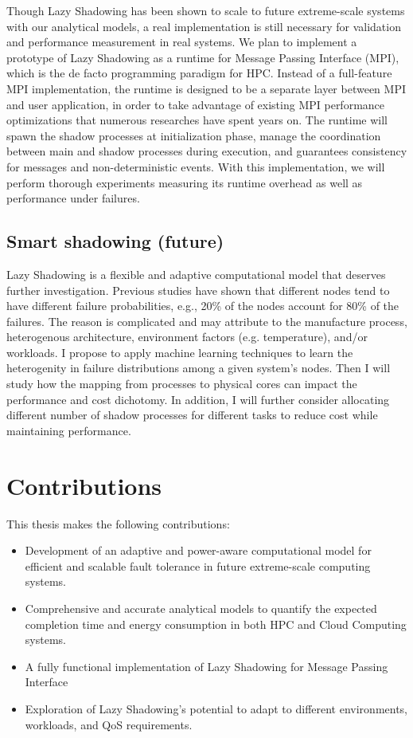 Though Lazy Shadowing has been shown to scale to future extreme-scale systems with our analytical models, a real implementation 
is still necessary for validation and performance measurement in real systems. We plan to implement a prototype of Lazy 
Shadowing as a runtime for Message Passing Interface (MPI), which is the de facto programming paradigm for HPC. Instead of 
a full-feature MPI implementation, the runtime is designed to be a separate layer between MPI and user application, in order 
to take advantage of existing MPI performance optimizations that numerous researches have spent years on. The runtime will spawn 
the shadow processes at initialization phase, manage the coordination between main and shadow processes during execution, 
and guarantees consistency for messages and non-deterministic events. With this implementation, we will perform thorough 
experiments measuring its runtime overhead as well as performance under failures.

\subsection{Smart shadowing (future)}
Lazy Shadowing is a flexible and adaptive computational model that deserves further investigation. Previous studies have shown that 
different nodes tend to have different failure probabilities, e.g., 20\% of the nodes account for 80\% of the failures. The reason 
is complicated and may attribute to the manufacture process, heterogenous architecture, environment factors (e.g. temperature), 
and/or workloads. I propose to apply machine learning techniques to learn the heterogenity in failure distributions among a given 
system's nodes. Then I will study how the mapping from processes to physical cores can impact the performance and cost dichotomy. 
In addition, I will further consider allocating different number of shadow processes for different tasks to reduce cost while 
maintaining performance. 

\section{Contributions}
This thesis makes the following contributions:

\begin{itemize}
\item Development of an adaptive and power-aware computational model for efficient and scalable fault tolerance in future extreme-scale 
computing systems.
\item Comprehensive and accurate analytical models to quantify the expected completion time and energy consumption in both HPC and Cloud Computing systems.
\item A fully functional implementation of Lazy Shadowing for Message Passing Interface
\item Exploration of Lazy Shadowing's potential to adapt to different environments, workloads, and QoS requirements. 
\end{itemize}


